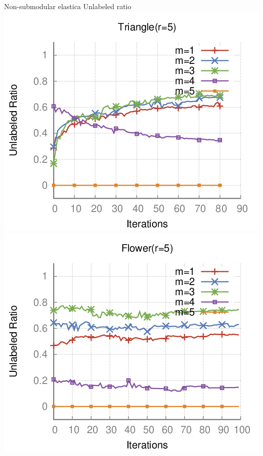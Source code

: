 \begin{frame}
{Non-submodular elastica}
{Unlabeled ratio}
\includegraphics[scale=0.28]{figures/non-submodular-elastica/level-effect/plot-unlabeled-triangle.png}\hspace{1em}
\includegraphics[scale=0.28]{figures/non-submodular-elastica/level-effect/plot-unlabeled-flower.png}


\end{frame}
